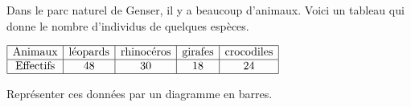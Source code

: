 \begin{exercice*}
    Dans le parc naturel de Genser, il y a beaucoup d'animaux.
    Voici un tableau qui donne le nombre d'individus de quelques espèces.
    
    \medskip
    $
    \begin{array}{|c|c|c|c|c|}
    \hline
    \text{Animaux} & \text{léopards} & \text{rhinocéros} & \text{girafes} & \text{crocodiles}\\
    \hline
    \text{Effectifs} & 48 & 30 & 18 & 24\\
    \hline
    \end{array}
    $
   
    \medskip
    Représenter ces données par un diagramme en barres.

\end{exercice*}

